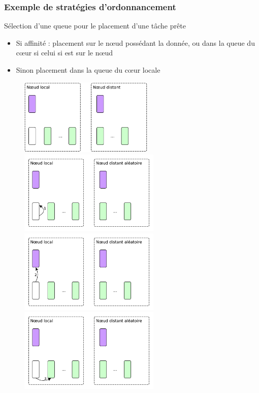 \documentclass[xcolor={usenames,dvipsnames,svgnames,table}, aspectratio=43]{beamer}
\begin{document}
\begin{frame}
\frametitle{Exemple de stratégies d'ordonnancement}

\vspace{0.3cm}
Sélection d'une queue pour le placement d'une tâche prête
\begin{itemize}
  \item Si affinité : placement sur le nœud possédant la donnée, ou dans la queue du cœur si celui si est sur le nœud
  \item Sinon placement dans la queue du cœur locale
\end{itemize}
\vspace{0.5cm}

\begin{figure}
   {%
    \includegraphics[width=0.57\textwidth]{graph/push_strategy.pdf}%
  }%
   {%
    \includegraphics[width=0.6\textwidth]{graph/steal_strategies_anim_1.pdf}%
  }%
   {%
    \includegraphics[width=0.6\textwidth]{graph/steal_strategies_anim_2.pdf}%
  }%
   {%
    \includegraphics[width=0.6\textwidth]{graph/steal_strategies_anim_3.pdf}%
}
\end{figure}
\end{frame}
\end{document}
